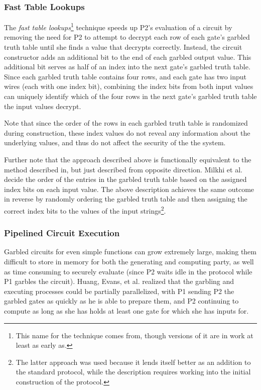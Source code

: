 \subsubsection{Fast Table Lookups}

The \emph{fast table lookups}\footnote{This name for the technique comes from\cite{huang2011faster}, though versions of it are in work at least as early as\cite{malkhi2004fairplay}.} technique speeds up \ac{P2}'s evaluation of a circuit by removing the need for \ac{P2} to attempt to decrypt each row of each gate's garbled truth table until she finds a value that decrypts correctly.  Instead, the circuit constructor adds an additional bit to the end of each garbled output value. This additional bit serves as half of an index into the next gate's garbled truth table. Since each garbled truth table contains four rows, and each gate has two input wires (each with one index bit), combining the index bits from both input values can uniquely identify which of the four rows in the next gate's garbled truth table the input values decrypt.

Note that since the order of the rows in each garbled truth table is randomized during construction, these index values do not reveal any information about the underlying values, and thus do not affect the security of the the system.

Further note that the approach described above is functionally equivalent to the method described in\cite{malkhi2004fairplay}, but just described from opposite direction.  Milkhi et al. decide the order of the entries in the garbled truth table based on the assigned index bits on each input value.  The above description achieves the same outcome in reverse by randomly ordering the garbled truth table and then assigning the correct index bits to the values of the input strings\footnote{The latter approach was used because it lends itself better as an addition to the standard protocol, while the \cite{malkhi2004fairplay} description requires working into the initial construction of the protocol.}.

\subsubsection{Pipelined Circuit Execution}
\label{sec:piplinedexecution}

Garbled circuits for even simple functions can grow extremely large, making them difficult to store in memory for both the generating and computing party, as well as time consuming to securely evaluate (since \ac{P2} waits idle in the protocol while \ac{P1} garbles the circuit).  Huang, Evans, et al.\cite{huang2011faster} realized that the garbling and executing processes could be partially parallelized, with \ac{P1} sending \ac{P2} the garbled gates as quickly as he is able to prepare them, and \ac{P2} continuing to compute as long as she has holds at least one gate for which she has inputs for.

